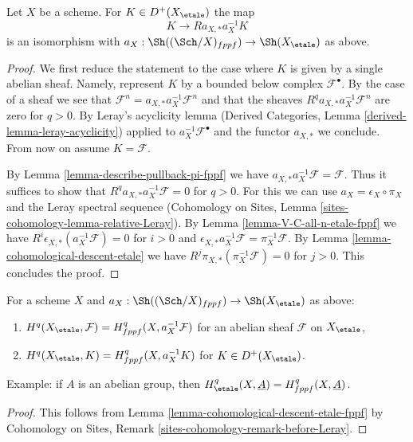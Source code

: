 \begin{lemma}
\label{lemma-cohomological-descent-etale-fppf}
Let $X$ be a scheme. For $K \in D^+(X_\etale)$ the map
$$
K \longrightarrow Ra_{X, *}a_X^{-1}K
$$
is an isomorphism with $a_X : \Sh((\Sch/X)_{fppf}) \to \Sh(X_\etale)$
as above.
\end{lemma}

\begin{proof}
We first reduce the statement to the case where
$K$ is given by a single abelian sheaf. Namely, represent $K$
by a bounded below complex $\mathcal{F}^\bullet$. By the case of a
sheaf we see that
$\mathcal{F}^n = a_{X, *} a_X^{-1} \mathcal{F}^n$
and that the sheaves $R^qa_{X, *}a_X^{-1}\mathcal{F}^n$
are zero for $q > 0$. By Leray's acyclicity lemma
(Derived Categories, Lemma \ref{derived-lemma-leray-acyclicity})
applied to $a_X^{-1}\mathcal{F}^\bullet$
and the functor $a_{X, *}$ we conclude. From now on assume $K = \mathcal{F}$.

\medskip\noindent
By Lemma \ref{lemma-describe-pullback-pi-fppf} we have
$a_{X, *}a_X^{-1}\mathcal{F} = \mathcal{F}$. Thus it suffices to show that
$R^qa_{X, *}a_X^{-1}\mathcal{F} = 0$ for $q > 0$.
For this we can use $a_X = \epsilon_X \circ \pi_X$ and
the Leray spectral sequence
(Cohomology on Sites, Lemma \ref{sites-cohomology-lemma-relative-Leray}).
By Lemma \ref{lemma-V-C-all-n-etale-fppf}
we have $R^i\epsilon_{X, *}(a_X^{-1}\mathcal{F}) = 0$ for $i > 0$
and
$\epsilon_{X, *}a_X^{-1}\mathcal{F} = \pi_X^{-1}\mathcal{F}$.
By Lemma \ref{lemma-cohomological-descent-etale} we have
$R^j\pi_{X, *}(\pi_X^{-1}\mathcal{F}) = 0$ for $j > 0$.
This concludes the proof.
\end{proof}

\begin{lemma}
\label{lemma-compare-cohomology-etale-fppf}
For a scheme $X$ and $a_X : \Sh((\Sch/X)_{fppf}) \to \Sh(X_\etale)$
as above:
\begin{enumerate}
\item $H^q(X_\etale, \mathcal{F}) = H^q_{fppf}(X, a_X^{-1}\mathcal{F})$
for an abelian sheaf $\mathcal{F}$ on $X_\etale$,
\item $H^q(X_\etale, K) = H^q_{fppf}(X, a_X^{-1}K)$ for $K \in D^+(X_\etale)$.
\end{enumerate}
Example: if $A$ is an abelian group, then
$H^q_\etale(X, \underline{A}) = H^q_{fppf}(X, \underline{A})$.
\end{lemma}

\begin{proof}
This follows from Lemma \ref{lemma-cohomological-descent-etale-fppf}
by Cohomology on Sites, Remark \ref{sites-cohomology-remark-before-Leray}.
\end{proof}







